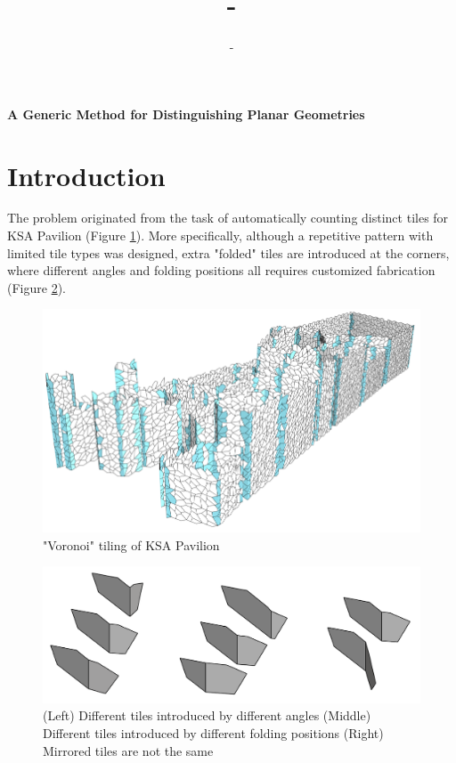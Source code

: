 \documentclass{article}
\title{-}
\author{-}
\begin{document}
\begin{center}

	\Large\bfseries
	A Generic Method for Distinguishing Planar Geometries

\end{center}

\section{Introduction}

The problem originated from the task of automatically counting distinct tiles for KSA Pavilion (Figure \ref{overview}). More specifically, although a repetitive pattern with limited tile types was designed, extra "folded" tiles are introduced at the corners, where different angles and folding positions all requires customized fabrication (Figure \ref{tile}).

\begin{figure}[hbt!]
	\centering
	\includegraphics[width=1\textwidth]{Figures/Overview.png}
	\caption{"Voronoi" tiling of KSA Pavilion}
	\label{overview}
\end{figure}

\begin{figure}[hbt!]
	\centering
	\includegraphics[width=1\textwidth]{Figures/Tiles.png}
	\caption{
        (Left) Different tiles introduced by different angles  
        (Middle) Different tiles introduced by different folding positions  
        (Right) Mirrored tiles are not the same
    }
	\label{tile}
\end{figure}
\end{document}
